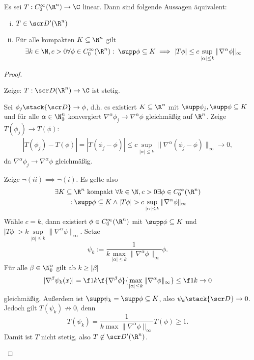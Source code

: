 \begin{st} \label{5.25}
	Es sei $T : C_0^\infty (\R^n) \to \C$ linear.
	Dann sind folgende Aussagen äquivalent:
	\begin{enumerate}[(i)]
		\item
			$T \in \scr D'(\R^n)$
		\item
			Für alle kompakten $K \subset \R^n$ gilt
			\[
				\exists k \in \N, c > 0 \forall \phi \in C_0^\infty(\R^n) : \;
				\supp \phi \subset K \implies |T\phi| \le c \sup_{|\alpha| \le k} \|\nabla^\alpha \phi\|_\infty
			\]
	\end{enumerate}
	\begin{proof}
		\begin{seg}[(ii)$\implies$(i)]
			Zeige: $T : \scr D(\R^n) \to \C$ ist stetig.

			Sei $\phi_j \stack {\scr D}\to \phi$, d.h. es existiert $K \subset \R^n$ mit $\supp \phi_j, \supp \phi \subset K$ und für alle $\alpha \in \N_0^n$ konvergiert $\nabla^\alpha \phi_j \to \nabla^\alpha \phi$ gleichmäßig auf $\R^n$.
			Zeige $T(\phi_j) \to T(\phi)$:
			\begin{align*}
				|T(\phi_j) - T(\phi)|
				= | T(\phi_j-\phi)|
				\le c \sup_{|\alpha| \le k} \| \nabla^\alpha (\phi_j - \phi) \|_\infty
				\to 0,
			\end{align*}
			da $\nabla^\alpha \phi_j \to \nabla^\alpha \phi$ gleichmäßig.
		\end{seg}
		\begin{seg}[(i)$\implies$ (ii)]
			Zeige $\lnot (ii) \implies \lnot (i)$.
			Es gelte also
			\begin{align*}
				&\exists K \subset \R^n \text{ kompakt } \forall k \in \N,  c > 0 \exists \phi \in C_0^\infty(\R^n) \\
				& \qquad : \supp \phi \subset K \land |T\phi| > c \sup_{|\alpha|\le k} \|\nabla^\alpha \phi \|_\infty
			\end{align*}
			Wähle $c = k$, dann existiert $\phi \in C_0^\infty (\R^n)$ mit $\supp \phi \subset K$ und $|T \phi| > k \sup\limits_{|\alpha| \le k} \|\nabla^\alpha \phi\|_\infty$.
			Setze
			\[
				\psi_k := \dfrac 1{k \max\limits_{|\alpha| \le k}\| \nabla^\alpha \phi\|_\infty} \phi.
			\]
			Für alle $\beta \in \N_0^n$ gilt ab $k \ge |\beta|$
			\[
				|\nabla^\beta \psi_k(x)|
				= \f 1k \f{\nabla^\beta \phi}{\max\limits_{|\alpha|\le k} \|\nabla^\alpha \phi\|_\infty}
				\le \f 1k
				\to 0
			\]
			gleichmäßig.
			Außerdem ist $\supp \psi_k = \supp \phi \subset K$, also $\psi_k \stack {\scr D}\to 0$.
			Jedoch gilt $T(\psi_k) \not\to 0$, denn
			\[
				T(\psi_k)
				= \dfrac 1{k \max\|\nabla^\alpha \phi\|_\infty} T(\phi)
				\ge 1.
			\]
			Damit ist $T$ nicht stetig, also $T \not\in \scr D'(\R^n)$.
		\end{seg}
	\end{proof}
\end{st}


